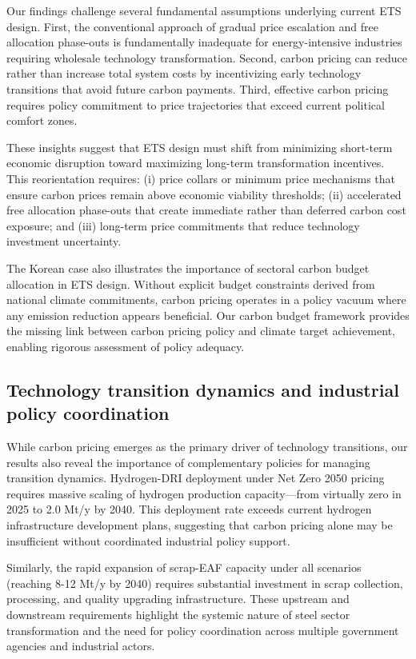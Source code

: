 \documentclass[preprint,1p,authoryear]{elsarticle}
\begin{document}
Our findings challenge several fundamental assumptions underlying current ETS design. First, the conventional approach of gradual price escalation and free allocation phase-outs is fundamentally inadequate for energy-intensive industries requiring wholesale technology transformation. Second, carbon pricing can reduce rather than increase total system costs by incentivizing early technology transitions that avoid future carbon payments. Third, effective carbon pricing requires policy commitment to price trajectories that exceed current political comfort zones.

These insights suggest that ETS design must shift from minimizing short-term economic disruption toward maximizing long-term transformation incentives. This reorientation requires: (i) price collars or minimum price mechanisms that ensure carbon prices remain above economic viability thresholds; (ii) accelerated free allocation phase-outs that create immediate rather than deferred carbon cost exposure; and (iii) long-term price commitments that reduce technology investment uncertainty.

The Korean case also illustrates the importance of sectoral carbon budget allocation in ETS design. Without explicit budget constraints derived from national climate commitments, carbon pricing operates in a policy vacuum where any emission reduction appears beneficial. Our carbon budget framework provides the missing link between carbon pricing policy and climate target achievement, enabling rigorous assessment of policy adequacy.

\subsection{Technology transition dynamics and industrial policy coordination}

While carbon pricing emerges as the primary driver of technology transitions, our results also reveal the importance of complementary policies for managing transition dynamics. Hydrogen-DRI deployment under Net Zero 2050 pricing requires massive scaling of hydrogen production capacity—from virtually zero in 2025 to 2.0 Mt/y by 2040. This deployment rate exceeds current hydrogen infrastructure development plans, suggesting that carbon pricing alone may be insufficient without coordinated industrial policy support.

Similarly, the rapid expansion of scrap-EAF capacity under all scenarios (reaching 8-12 Mt/y by 2040) requires substantial investment in scrap collection, processing, and quality upgrading infrastructure. These upstream and downstream requirements highlight the systemic nature of steel sector transformation and the need for policy coordination across multiple government agencies and industrial actors.
\end{document}
